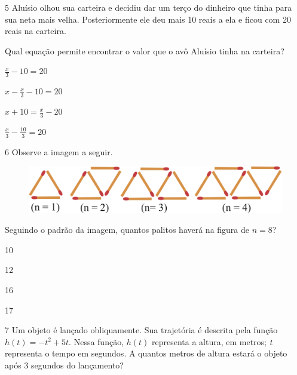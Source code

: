 \num{5} Aluísio olhou sua carteira e decidiu dar um terço do dinheiro 
que tinha para sua neta mais velha. Posteriormente ele deu mais 10 reais 
a ela e ficou com 20 reais na carteira.

Qual equação permite encontrar o valor que o avô Aluísio tinha na 
carteira?

\begin{escolha}

\item $\frac{x}{3} - 10 = 20$ 

\item $x - \frac{x}{3} - 10 = 20$ 

\item $x + 10 = \frac{x}{3} - 20$ 

\item $\frac{x}{3} - \frac{10}{3} = 20$ 

\end{escolha}

\num{6} Observe a imagem a seguir. 

\begin{figure}[htpb!]
\centering
\includegraphics[width=\textwidth]{./ilustras-mat/Simulado_1-atividade_6.png}
\end{figure}

Seguindo o padrão da imagem, quantos palitos haverá na figura de $n = 8$?

\begin{escolha}

  \item 10

  \item 12

  \item 16

  \item 17

\end{escolha}

\num{7} Um objeto é lançado obliquamente. Sua trajetória é descrita pela
função $h(t) = - t^{2} + 5t$. Nessa função, $h(t)$ representa a altura, em
metros; \textit{t} representa o tempo em segundos. A quantos metros de altura
estará o objeto após 3 segundos do lançamento?

